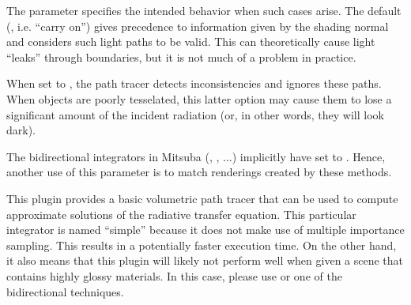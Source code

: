 The 
parameter specifies the intended behavior when such cases arise. The default (, i.e. ``carry on'')
gives precedence to information given by the shading normal and considers such light paths to be valid.
This can theoretically cause light ``leaks'' through boundaries, but it is not much of a problem in practice.

When set to , the path tracer detects inconsistencies and ignores these paths. When objects
are poorly tesselated, this latter option may cause them to lose a significant amount of the incident
radiation (or, in other words, they will look dark).

The bidirectional integrators in Mitsuba (, ,  ...)
implicitly have  set to . Hence, another use of this parameter
is to match renderings created by these methods.


This plugin provides a basic volumetric path tracer that can be used to
compute approximate solutions of the radiative transfer equation. This
particular integrator is named ``simple'' because it does not make use of
multiple importance sampling. This results in a potentially
faster execution time. On the other hand, it also means that this
plugin will likely not perform well when given a scene that contains
highly glossy materials. In this case, please use 
or one of the bidirectional techniques.

